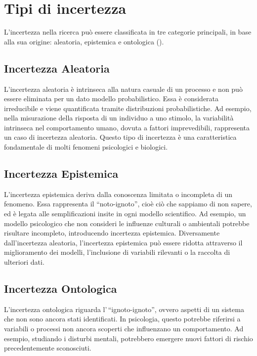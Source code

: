 \documentclass[
  letterpaper,
  DIV=11,
  numbers=noendperiod]{scrreprt}
\theoremstyle{definition}
\theoremstyle{remark}
\begin{document}
\section{Tipi di incertezza}\label{tipi-di-incertezza}

L'incertezza nella ricerca può essere classificata in tre categorie
principali, in base alla sua origine: aleatoria, epistemica e ontologica
().

\subsection{Incertezza Aleatoria}\label{incertezza-aleatoria}

L'incertezza aleatoria è intrinseca alla natura casuale di un processo e
non può essere eliminata per un dato modello probabilistico. Essa è
considerata irreducibile e viene quantificata tramite distribuzioni
probabilistiche. Ad esempio, nella misurazione della risposta di un
individuo a uno stimolo, la variabilità intrinseca nel comportamento
umano, dovuta a fattori imprevedibili, rappresenta un caso di incertezza
aleatoria. Questo tipo di incertezza è una caratteristica fondamentale
di molti fenomeni psicologici e biologici.

\subsection{Incertezza Epistemica}\label{incertezza-epistemica}

L'incertezza epistemica deriva dalla conoscenza limitata o incompleta di
un fenomeno. Essa rappresenta il ``noto-ignoto'', cioè ciò che sappiamo
di non sapere, ed è legata alle semplificazioni insite in ogni modello
scientifico. Ad esempio, un modello psicologico che non consideri le
influenze culturali o ambientali potrebbe risultare incompleto,
introducendo incertezza epistemica. Diversamente dall'incertezza
aleatoria, l'incertezza epistemica può essere ridotta attraverso il
miglioramento dei modelli, l'inclusione di variabili rilevanti o la
raccolta di ulteriori dati.

\subsection{Incertezza Ontologica}\label{incertezza-ontologica}

L'incertezza ontologica riguarda l'\,``ignoto-ignoto'', ovvero aspetti
di un sistema che non sono ancora stati identificati. In psicologia,
questo potrebbe riferirsi a variabili o processi non ancora scoperti che
influenzano un comportamento. Ad esempio, studiando i disturbi mentali,
potrebbero emergere nuovi fattori di rischio precedentemente
sconosciuti.
\end{document}
